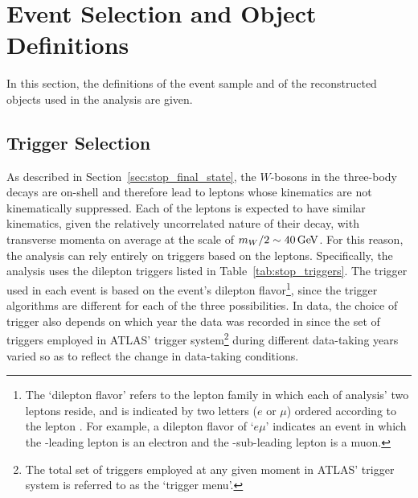 \section{Event Selection and Object Definitions}
\label{sec:stop_event_sel}

In this section, the definitions of the event sample and of the reconstructed
objects used in the analysis are given.

%
%

\subsection{Trigger Selection}
\label{sec:stop_trigger}

As described in Section~\ref{sec:stop_final_state}, the $W$-bosons in the three-body
\stopone decays are on-shell and therefore lead to leptons whose kinematics are not
kinematically suppressed.
Each of the leptons is expected to have similar kinematics, given the relatively uncorrelated nature
of their decay, with transverse momenta on average at the scale of $m_W / 2 \sim 40\,\text{Ge\kern -0.1em V}$.
For this reason, the analysis can rely entirely on triggers based on the leptons.
Specifically, the analysis uses the dilepton triggers listed in Table~\ref{tab:stop_triggers}.
The trigger used in each event is based on the event's dilepton flavor\footnote{The `dilepton flavor' refers to the lepton family in which each
of analysis' two leptons reside, and is indicated by two letters ($e$ or $\mu$) ordered according
to the lepton \pT. For example, a dilepton flavor of `$e\mu$' indicates an event in which the
\pT-leading lepton is an electron and the \pT-sub-leading lepton is a muon.}, since
the trigger algorithms are different for each of the three possibilities.
In data, the choice of trigger also depends on which year the data was recorded in since
the set of triggers employed in ATLAS' trigger system\footnote{The total set of triggers employed at any
given moment in ATLAS' trigger system is referred to as the `trigger menu'.}
during different data-taking years varied so as to reflect the change in data-taking conditions.

